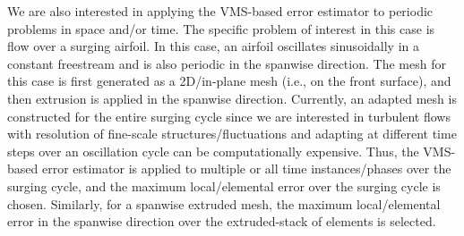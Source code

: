 We are also interested in applying the VMS-based error estimator to periodic problems in space and/or time. The specific problem of interest in this case is flow over a surging airfoil. In this case, an airfoil oscillates sinusoidally in a constant freestream and is also periodic in the spanwise direction. The mesh for this case is first generated as a 2D/in-plane mesh (i.e., on the front surface), and then extrusion is applied in the spanwise direction. Currently, an adapted mesh is constructed for the entire surging cycle since we are interested in turbulent flows with resolution of fine-scale structures/fluctuations and adapting at different time steps over an oscillation cycle can be computationally expensive. Thus, the VMS-based error estimator is applied to multiple or all time instances/phases over the surging cycle, and the maximum local/elemental error over the surging cycle is chosen. Similarly, for a spanwise extruded mesh, the maximum local/elemental error in the spanwise direction over the extruded-stack of elements is selected.